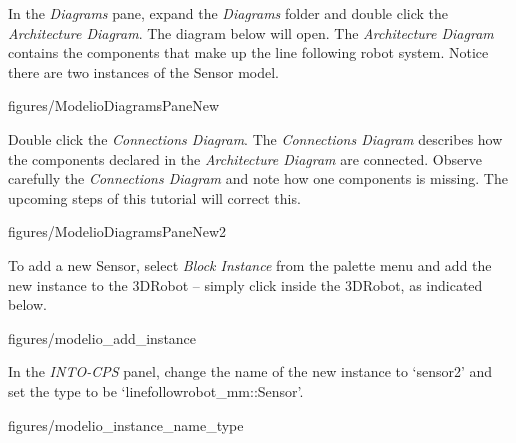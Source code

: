 \documentclass[11pt,a4paper]{../tutorial}
\begin{document}
\begin{instructions}
\newpage
\item In the \emph{Diagrams} pane, expand the \emph{Diagrams} folder and double click the \emph{Architecture Diagram}. The diagram below will open. 
The \emph{Architecture Diagram} contains the components that make up the line following robot system. 
Notice there are two instances of the Sensor model.

\begin{annotation}[width=\linewidth,trim=0 0 0 0,clip]{figures/ModelioDiagramsPaneNew}
    \end{annotation}

\newpage

\item Double click the \emph{Connections Diagram}. The \emph{Connections Diagram} describes how the components declared in the \emph{Architecture Diagram} are connected. Observe carefully the \emph{Connections Diagram} and note how one components is missing. The upcoming steps of this tutorial will correct this.

    \begin{annotation}[width=\linewidth,trim=0 0 0 350,clip]{figures/ModelioDiagramsPaneNew2}
    \end{annotation}


\item To add a new Sensor, select \emph{Block Instance} from the palette menu and add the new instance to the 3DRobot -- simply click inside the 3DRobot, as indicated below.

\begin{annotation}[width=0.7\linewidth,trim=0 500 0 0,clip]{figures/modelio_add_instance}
    \end{annotation}

\item In the \emph{INTO-CPS} panel, change the name of the new instance to `sensor2' and set the type to be `linefollowrobot\_mm::Sensor'.

\begin{annotation}[width=0.55\linewidth,trim=180 0 0 750,clip]{figures/modelio_instance_name_type}
\end{annotation}


\end{instructions}
\end{document}
